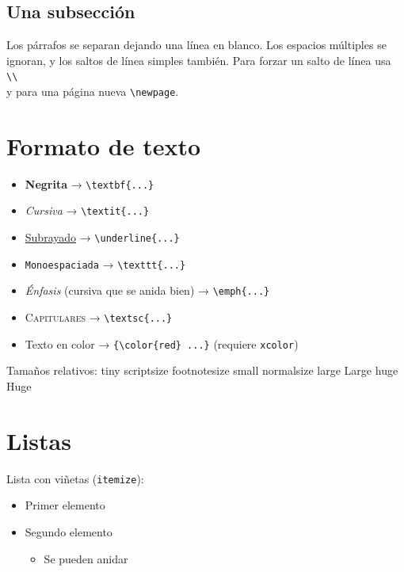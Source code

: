 \subsection{Una subsección}
Los párrafos se separan dejando una línea en blanco.
Los espacios múltiples      se      ignoran, y los saltos de línea
simples también. Para forzar un salto de línea usa \texttt{\textbackslash\textbackslash} \\
y para una página nueva \texttt{\textbackslash newpage}.

\section{Formato de texto}
\begin{itemize}
  \item \textbf{Negrita} → \texttt{\textbackslash textbf\{...\}}
  \item \textit{Cursiva} → \texttt{\textbackslash textit\{...\}}
  \item \underline{Subrayado} → \texttt{\textbackslash underline\{...\}}
  \item \texttt{Monoespaciada} → \texttt{\textbackslash texttt\{...\}}
  \item \emph{Énfasis} (cursiva que se anida bien) → \texttt{\textbackslash emph\{...\}}
  \item \textsc{Capitulares} → \texttt{\textbackslash textsc\{...\}}
  \item {\color{red} Texto en color} → \texttt{\{\textbackslash color\{red\} ...\}} (requiere \texttt{xcolor})
\end{itemize}

Tamaños relativos:
{\tiny tiny} {\scriptsize scriptsize} {\footnotesize footnotesize}
{\small small} {\normalsize normalsize} {\large large} {\Large Large}
{\huge huge} {\Huge Huge}

\section{Listas}
Lista con viñetas (\texttt{itemize}):
\begin{itemize}
  \item Primer elemento
  \item Segundo elemento
  \begin{itemize}
    \item Se pueden anidar
  \end{itemize}
\end{itemize}

